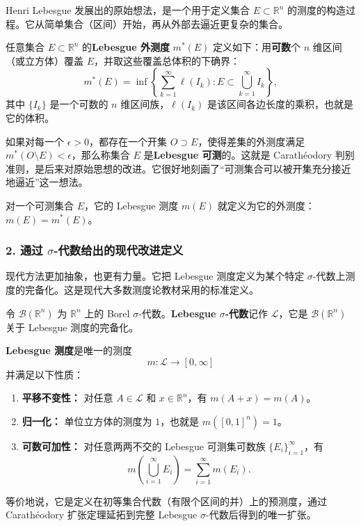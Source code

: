 Henri Lebesgue 发展出的原始想法，是一个用于定义集合 $E\subset\mathbb{R}^n$ 的测度的构造过程。它从简单集合（区间）开始，再从外部去逼近更复杂的集合。

\begin{definition}
任意集合 $E\subset\mathbb{R}^n$ 的\textbf{Lebesgue 外测度} $m^*(E)$ 定义如下：用\textbf{可数}个 $n$ 维区间（或立方体）覆盖 $E$，并取这些覆盖总体积的下确界：
\[
m^*(E)=\inf\left\{\sum_{k=1}^{\infty}\ell(I_k):E\subset\bigcup_{k=1}^{\infty}I_k\right\},
\]
其中 $\{I_k\}$ 是一个可数的 $n$ 维区间族，$\ell(I_k)$ 是该区间各边长度的乘积，也就是它的体积。

如果对每一个 $\epsilon>0$，都存在一个开集 $O\supset E$，使得差集的外测度满足 $m^*(O\setminus E)<\epsilon$，那么称集合 $E$ 是\textbf{Lebesgue 可测}的。这就是 Carathéodory 判别准则，是后来对原始思想的改进。它很好地刻画了“可测集合可以被开集充分接近地逼近”这一想法。

对一个可测集合 $E$，它的 Lebesgue 测度 $m(E)$ 就定义为它的外测度：$m(E)=m^*(E)$。
\end{definition}

\subsubsection*{2. 通过 $\sigma$-代数给出的现代改进定义}

现代方法更加抽象，也更有力量。它把 Lebesgue 测度定义为某个特定 $\sigma$-代数上测度的完备化。这是现代大多数测度论教材采用的标准定义。

\begin{definition}
令 $\mathcal{B}(\mathbb{R}^n)$ 为 $\mathbb{R}^n$ 上的 Borel $\sigma$-代数。\textbf{Lebesgue $\sigma$-代数}记作 $\mathcal{L}$，它是 $\mathcal{B}(\mathbb{R}^n)$ 关于 Lebesgue 测度的完备化。

\textbf{Lebesgue 测度}是唯一的测度
\[
m:\mathcal{L}\to[0,\infty]
\]
并满足以下性质：
\begin{enumerate}
    \item \textbf{平移不变性：} 对任意 $A\in\mathcal{L}$ 和 $x\in\mathbb{R}^n$，有 $m(A+x)=m(A)$。
    \item \textbf{归一化：} 单位立方体的测度为 $1$，也就是 $m([0,1]^n)=1$。
    \item \textbf{可数可加性：} 对任意两两不交的 Lebesgue 可测集可数族 $\{E_i\}_{i=1}^{\infty}$，有
    \[
    m\left(\bigcup_{i=1}^{\infty}E_i\right)=\sum_{i=1}^{\infty}m(E_i).
    \]
\end{enumerate}
等价地说，它是定义在初等集合代数（有限个区间的并）上的预测度，通过 Carathéodory 扩张定理延拓到完整 Lebesgue $\sigma$-代数后得到的唯一扩张。
\end{definition}

